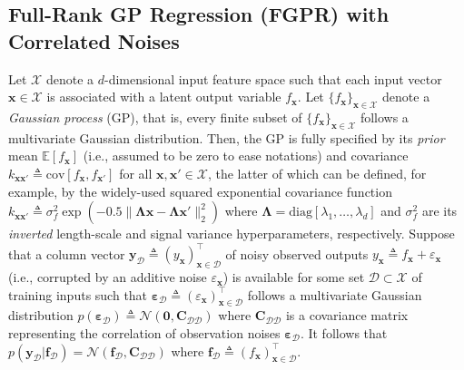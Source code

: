 \documentclass[conference]{IEEEtran}
\begin{document}
\subsection{Full-Rank GP Regression (FGPR) with Correlated  Noises}
\label{full}%
Let $\mathcal{X}$ denote a $d$-dimensional input feature space such that each input vector $\mathbf{x}\in\mathcal{X}$ is associated with a latent output variable $f_{\mathbf{x}}$.
		Let $\{f_{\mathbf{x}}\}_{\mathbf{x}\in\mathcal{X}}$ denote a \emph{Gaussian process} (GP), that is, every finite subset of $\{f_{\mathbf{x}}\}_{\mathbf{x}\in\mathcal{X}}$ follows a multivariate Gaussian distribution. Then, the GP is fully specified by its \emph{prior} mean $\mathbb{E}[f_\mathbf{x}]$  (i.e., assumed to be zero to ease notations) and covariance $k_{\mathbf{x}\mathbf{x}'}\triangleq\mathrm{cov}[f_\mathbf{x}, f_{\mathbf{x}'}]$ for all $\mathbf{x}, \mathbf{x}' \in \mathcal{X}$, the latter of which can be defined, for example, by the widely-used squared exponential covariance function $k_{\mathbf{x}\mathbf{x}'} \triangleq 
\sigma_f^2\exp(-0.5\|\mathbf{\Lambda}\mathbf{x} - \mathbf{\Lambda}\mathbf{x}'\|^2_2)$ where 
$\mathbf{\Lambda} = \mathrm{diag}[\lambda_1,\ldots,\lambda_d]$ and $\sigma_f^2$ are its \emph{inverted} length-scale and signal variance hyperparameters, respectively. 
Suppose that a column vector $\mathbf{y}_\mathcal{D}\triangleq (y_{\mathbf{x}})^\top_{\mathbf{x}\in\mathcal{D}}$ of noisy observed outputs $y_{\mathbf{x}}\triangleq f_{\mathbf{x}}+\varepsilon_{\mathbf{x}}$ (i.e., corrupted by an additive noise $\varepsilon_{\mathbf{x}}$) is available for some set $\mathcal{D}\subset\mathcal{X}$ of training inputs such that $\boldsymbol{\varepsilon}_{\mathcal{D}}\triangleq(\varepsilon_{\mathbf{x}})^\top_{\mathbf{x} \in \mathcal{D}}$ follows a multivariate Gaussian distribution $p(\boldsymbol{\varepsilon}_{\mathcal{D}}) \triangleq \mathcal{N}(\mathbf{0},\mathbf{C}_{\mathcal{DD}})$ where $\mathbf{C}_{\mathcal{DD}}$   
 is a covariance matrix representing the correlation of observation noises $\boldsymbol{\varepsilon}_\mathcal{D}$. 	It follows that $p(\mathbf{y}_\mathcal{D}|\mathbf{f}_\mathcal{D})=\mathcal{N}(\mathbf{f}_\mathcal{D},\mathbf{C}_{\mathcal{DD}})$ where $\mathbf{f}_\mathcal{D}\triangleq (f_{\mathbf{x}})^\top_{\mathbf{x}\in\mathcal{D}}$.
\end{document}
